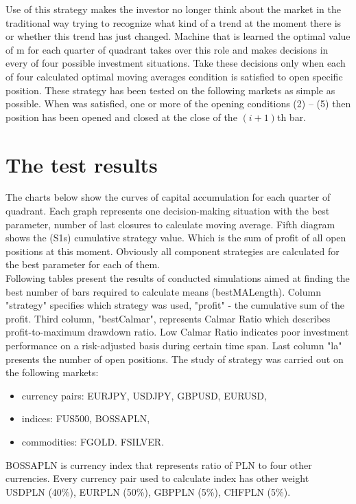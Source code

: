 \documentclass{tewiart}
\begin{document}
Use of this strategy makes the investor no longer think about the market in the traditional way trying to recognize what kind of a trend at the moment there is or whether this trend has just changed. Machine that is learned the optimal value of m for each quarter of quadrant takes over this role and makes decisions in every of four possible investment situations. Take these decisions only when each of four calculated optimal moving averages condition is satisfied to open specific position.
These strategy has been tested on the following markets as simple as possible. When was satisfied, one or more of the opening conditions (2) – (5) then position has been opened and closed at the close of the $(i +1)$th bar.





\section{The test results}
\indent The charts below show the curves of capital accumulation for each quarter of quadrant. Each graph represents one decision-making situation with the best parameter, number of last closures to calculate moving average. Fifth diagram shows the (S1s) cumulative strategy value. Which is the sum of profit of all open positions at this moment. Obviously all component strategies are calculated for the best parameter for each of them.\\
\indent Following tables present the results of conducted simulations aimed at finding the best number of bars required to calculate means (bestMALength). Column "strategy" specifies which strategy was used, "profit" - the cumulative sum of the profit. Third column, "bestCalmar", represents Calmar Ratio which describes profit-to-maximum drawdown ratio. Low Calmar Ratio indicates poor investment performance on a risk-adjusted basis during certain time span. Last column "la" presents the number of open positions.
The study of strategy was carried out on the following markets:
\begin{itemize}
\item currency pairs: EURJPY, USDJPY, GBPUSD, EURUSD,
\item indices: FUS500, BOSSAPLN,
\item commodities: FGOLD. FSILVER.
\end{itemize}
BOSSAPLN is currency index that represents ratio of PLN to four other currencies. Every currency pair used to calculate index has other weight USDPLN (40\%), EURPLN (50\%), GBPPLN (5\%), CHFPLN (5\%).
\end{document}
